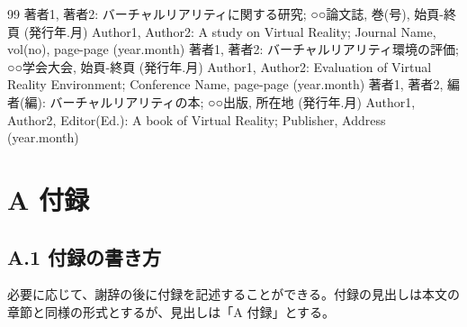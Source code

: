 \documentclass[a4paper,twoside]{jarticle}
\begin{document}
\begin{thebibliography}{99}
著者1, 著者2: バーチャルリアリティに関する研究; ○○論文誌, 巻(号), 
始頁-終頁 (発行年.月)
Author1, Author2: A study on Virtual Reality; Journal Name, vol(no), 
page-page (year.month)
著者1, 著者2: バーチャルリアリティ環境の評価; ○○学会大会, 始頁-終頁 
(発行年.月)
Author1, Author2: Evaluation of Virtual Reality Environment;
Conference Name, page-page (year.month)
著者1, 著者2, 編者(編): バーチャルリアリティの本; ○○出版, 所在地 (発行年.月)
Author1, Author2, Editor(Ed.): A book of Virtual Reality; Publisher, Address (year.month)
\end{thebibliography}

\newpage

\section*{A 付録}
\subsection*{A.1 付録の書き方}
必要に応じて、謝辞の後に付録を記述することができる。付録の見出しは本文の
章節と同様の形式とするが、見出しは「A 付録」とする。

 \\
\end{document}
